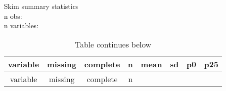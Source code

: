 \documentclass[]{article}
\newenvironment{Shaded}{\begin{snugshade}}{\end{snugshade}}
\newcommand{\CommentTok}[1]{\textcolor[rgb]{0.56,0.35,0.01}{\textit{#1}}}
\newcommand{\KeywordTok}[1]{\textcolor[rgb]{0.13,0.29,0.53}{\textbf{#1}}}
\newcommand{\NormalTok}[1]{#1}
\newcommand{\OperatorTok}[1]{\textcolor[rgb]{0.81,0.36,0.00}{\textbf{#1}}}
\newcommand{\StringTok}[1]{\textcolor[rgb]{0.31,0.60,0.02}{#1}}
\begin{document}
\begin{Shaded}
\end{Shaded}

Skim summary statistics\\
n obs:\\
n variables:

\begin{longtable}[]{@{}cccccccc@{}}
\caption{Table continues below}\tabularnewline
\toprule
\begin{minipage}[b]{0.11\columnwidth}\centering
variable\strut
\end{minipage} & \begin{minipage}[b]{0.10\columnwidth}\centering
missing\strut
\end{minipage} & \begin{minipage}[b]{0.11\columnwidth}\centering
complete\strut
\end{minipage} & \begin{minipage}[b]{0.08\columnwidth}\centering
n\strut
\end{minipage} & \begin{minipage}[b]{0.10\columnwidth}\centering
mean\strut
\end{minipage} & \begin{minipage}[b]{0.10\columnwidth}\centering
sd\strut
\end{minipage} & \begin{minipage}[b]{0.10\columnwidth}\centering
p0\strut
\end{minipage} & \begin{minipage}[b]{0.10\columnwidth}\centering
p25\strut
\end{minipage}\tabularnewline
\midrule
\endfirsthead
\toprule
\begin{minipage}[b]{0.11\columnwidth}\centering
variable\strut
\end{minipage} & \begin{minipage}[b]{0.10\columnwidth}\centering
missing\strut
\end{minipage} & \begin{minipage}[b]{0.11\columnwidth}\centering
complete\strut
\end{minipage} & \begin{minipage}[b]{0.08\columnwidth}\centering
n\strut
\end{minipage} & \begin{minipage}[b]{0.10\columnwidth}\centering

\end{minipage}
\end{longtable}
\end{document}
